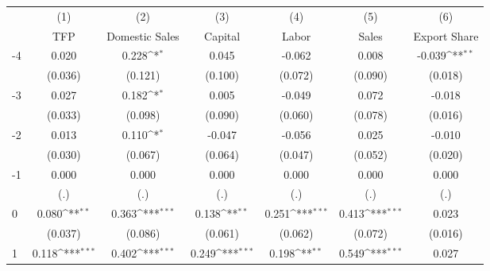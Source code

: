 {
\def\sym#1{\ifmmode^{#1}\else\(^{#1}\)\fi}
\begin{tabular}{l*{6}{c}}
\hline\hline
                    &\multicolumn{1}{c}{(1)}&\multicolumn{1}{c}{(2)}&\multicolumn{1}{c}{(3)}&\multicolumn{1}{c}{(4)}&\multicolumn{1}{c}{(5)}&\multicolumn{1}{c}{(6)}\\
                    &\multicolumn{1}{c}{TFP}&\multicolumn{1}{c}{Domestic Sales}&\multicolumn{1}{c}{Capital}&\multicolumn{1}{c}{Labor}&\multicolumn{1}{c}{Sales}&\multicolumn{1}{c}{Export Share}\\
\hline
-4                  &       0.020         &       0.228\sym{*}  &       0.045         &      -0.062         &       0.008         &      -0.039\sym{**} \\
                    &     (0.036)         &     (0.121)         &     (0.100)         &     (0.072)         &     (0.090)         &     (0.018)         \\
[1em]
-3                  &       0.027         &       0.182\sym{*}  &       0.005         &      -0.049         &       0.072         &      -0.018         \\
                    &     (0.033)         &     (0.098)         &     (0.090)         &     (0.060)         &     (0.078)         &     (0.016)         \\
[1em]
-2                  &       0.013         &       0.110\sym{*}  &      -0.047         &      -0.056         &       0.025         &      -0.010         \\
                    &     (0.030)         &     (0.067)         &     (0.064)         &     (0.047)         &     (0.052)         &     (0.020)         \\
[1em]
-1                  &       0.000         &       0.000         &       0.000         &       0.000         &       0.000         &       0.000         \\
                    &         (.)         &         (.)         &         (.)         &         (.)         &         (.)         &         (.)         \\
[1em]
0                   &       0.080\sym{**} &       0.363\sym{***}&       0.138\sym{**} &       0.251\sym{***}&       0.413\sym{***}&       0.023         \\
                    &     (0.037)         &     (0.086)         &     (0.061)         &     (0.062)         &     (0.072)         &     (0.016)         \\
[1em]
1                   &       0.118\sym{***}&       0.402\sym{***}&       0.249\sym{***}&       0.198\sym{**} &       0.549\sym{***}&       0.027         \\

\end{tabular}}
